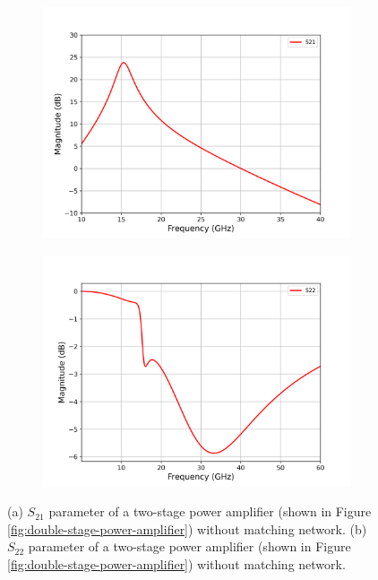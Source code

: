 \begin{figure}[H]
  \centering
  \begin{subfigure}{0.49\textwidth}
    \centering
    \includegraphics[width=\linewidth]{figures/two_stage_s21.png}
    \caption{}
    \label{fig:two-stage-without-cadence-s21}
  \end{subfigure}
  \hfill
  \begin{subfigure}{0.49\textwidth}
    \centering
    \includegraphics[width=\linewidth]{figures/two_stage_s22.png}
    \caption{}
     \label{fig:two-stage-without-cadence-s22}
  \end{subfigure}
  \caption{(a) $S_{21}$ parameter of a two-stage power amplifier (shown in Figure \ref{fig:double-stage-power-amplifier}) without matching network. (b) $S_{22}$ parameter of a two-stage power amplifier (shown in Figure \ref{fig:double-stage-power-amplifier}) without matching network.}
  \label{fig:two-stage-without-cadence-s21-s22}
\end{figure}

